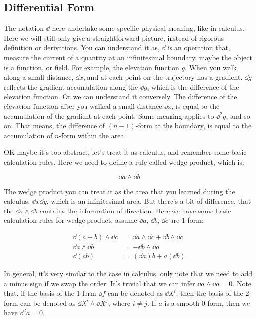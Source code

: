 \documentclass[../main.tex]{subfiles}
\begin{document}
\subsection{Differential Form}

The notation $\dd$ here undertake some specific physical meaning, like in calculus. Here we will still only give a straightforward picture, instead of rigorous definition or derivations. You can understand it as, $\dd$ is an operation that, measure the current of a quantity at an infinitesimal boundary, maybe the object is a function, or field. For example, the elevation function $g$. When you walk along a small distance, $\dd{x}$, and at each point on the trajectory has a gradient. $\dd{g}$ reflects the gradient accumulation along the $\dd{g}$, which is the difference of the elevation function. Or we can understand it conversely. The difference of the elevation function after you walked a small distance $\dd{x}$, is equal to the accumulation of the gradient at each point. Same meaning applies to $\dd^2{g}$, and so on. That means, the difference of $(n - 1)$-form at the boundary, is equal to the accumulation of $n$-form within the area. 

OK maybe it's too abstract, let's treat it as calculus, and remember some basic calculation rules. Here we need to define a rule called wedge product, which is:

\begin{equation}
    \dd{a}\wedge\dd{b}
\end{equation}

The wedge product you can treat it as the area that you learned during the calculus, $\dd{x}\dd{y}$, which is an infinitesimal area. But there's a bit of difference, that the $\dd{a}\wedge\dd{b}$ contains the information of direction. Here we have some basic calculation rules for wedge product, assume $\dd{a}$, $\dd{b}$, $\dd{c}$ are $1$-form:

\begin{align}
    \dd{(a + b)}\wedge\dd{c} &= \dd{a}\wedge\dd{c} + \dd{b}\wedge\dd{c}\\
    \dd{a}\wedge\dd{b} &= -\dd{b}\wedge\dd{a}\\
    \dd{(ab)} &= (\dd{a})b + a(\dd{b})
\end{align}

In general, it's very similar to the case in calculus, only note that we need to add a minus sign if we swap the order. It's trivial that we can infer $\dd{a}\wedge\dd{a} = 0$. Note that, if the basis of the $1$-form $\dd f$ can be denoted as $\dd{X^i}$, then the basis of the $2$-form can be denoted as $\dd{X}^i\wedge \dd X^j$, where $i\neq j$. If $a$ is a smooth $0$-form, then we have $\dd^2{a} = 0$.
\end{document}

